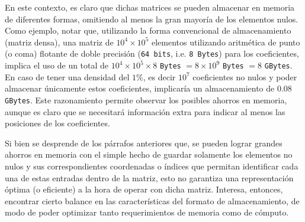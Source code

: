 En este contexto, es claro que dichas matrices se pueden almacenar en memoria de diferentes formas, omitiendo al menos la gran mayoría de los elementos nulos. Como ejemplo, notar que, utilizando la forma convencional de almacenamiento (matriz densa), una matriz de $10^4 \times 10^5$ elementos utilizando aritmética de punto (o coma) flotante de doble precisión (\texttt{64 bits}, i.e. \texttt{8 Bytes}) para los coeficientes, implica el uso de un total de $10^4 \times 10^5 \times 8$ \texttt{Bytes} $ = 8\times 10^9$ \texttt{Bytes} $ = 8$ \texttt{GBytes}. En caso de tener una densidad del $1\%$, es decir $10^7$ coeficientes no nulos y poder almacenar únicamente estos coeficientes, implicaría un almacenamiento de $0.08$ \texttt{GBytes}. Este razonamiento permite observar los posibles ahorros en memoria, aunque es claro que se necesitará información extra para indicar al menos las posiciones de los coeficientes.





Si bien se desprende de los párrafos anteriores que, se pueden lograr grandes ahorros en memoria con el simple hecho de guardar solamente los elementos no nulos y sus correspondientes coordenadas o índices que permitan identificar cada una de estas entradas dentro de la matriz, esto no garantiza una representación óptima (o eficiente) a la hora de operar con dicha matriz. Interesa, entonces, encontrar cierto balance en las características del formato de almacenamiento, de modo de poder optimizar tanto requerimientos de memoria como de cómputo.


